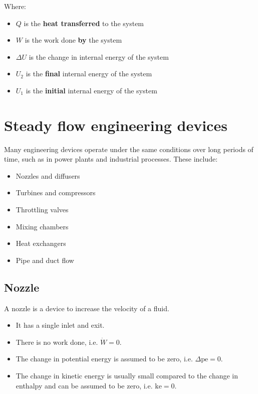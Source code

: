 \documentclass[11pt]{article}
\begin{document}
Where:
\begin{itemize}
\item \(Q\) is the \textbf{heat transferred} to the system
\item \(W\) is the work done \textbf{by} the system
\item \(\Delta U\) is the change in internal energy of the system
\item \(U_2\) is the \textbf{final} internal energy of the system
\item \(U_1\) is the \textbf{initial} internal energy of the system
\end{itemize}


\section{Steady flow engineering devices}
\label{sec:orgc7bb562}
Many engineering devices operate under the same conditions over long periods of time, such as in power plants and industrial processes. These include:
\begin{itemize}
\item Nozzles and diffusers
\item Turbines and compressors
\item Throttling valves
\item Mixing chambers
\item Heat exchangers
\item Pipe and duct flow
\end{itemize}

\subsection{Nozzle}
\label{sec:org93fd073}
A nozzle is a device to increase the velocity of a fluid.
\begin{itemize}
\item It has a single inlet and exit.
\item There is no work done, i.e. \(\dot{W} = 0\).
\item The change in potential energy is assumed to be zero, i.e. \(\Delta \text{pe} = 0\).
\item The change in kinetic energy is usually small compared to the change in enthalpy and can be assumed to be zero, i.e. \(\text{ke} = 0\).
\end{itemize}
\end{document}
